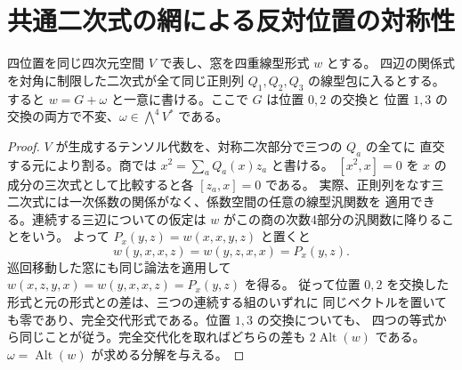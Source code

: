 \section{共通二次式の網による反対位置の対称性}
\label{sec:finite-common-net-symmetry}
\begin{lemma}\label{lem:common-net-alternating-part}
四位置を同じ四次元空間 $V$ で表し、窓を四重線型形式 $w$ とする。
四辺の関係式を対角に制限した二次式が全て同じ正則列
$Q_1,Q_2,Q_3$ の線型包に入るとする。
すると $w=G+\omega$ と一意に書ける。ここで $G$ は位置 $0,2$ の交換と
位置 $1,3$ の交換の両方で不変、$\omega\in\bigwedge^4 V^*$ である。
\end{lemma}
\begin{proof}
$V$ が生成するテンソル代数を、対称二次部分で三つの $Q_a$ の全てに
直交する元により割る。商では $x^2=\sum_a Q_a(x)z_a$ と書ける。
$[x^2,x]=0$ を $x$ の成分の三次式として比較すると各 $[z_a,x]=0$ である。
実際、正則列をなす三二次式には一次係数の関係がなく、係数空間の任意の線型汎関数を
適用できる。連続する三辺についての仮定は $w$ がこの商の次数4部分の汎関数に降りることをいう。
よって $P_x(y,z)=w(x,x,y,z)$ と置くと
\[
 w(y,x,x,z)=w(y,z,x,x)=P_x(y,z).
\]
巡回移動した窓にも同じ論法を適用して $w(x,z,y,x)=w(y,x,x,z)=P_x(y,z)$ を得る。
従って位置 $0,2$ を交換した形式と元の形式との差は、三つの連続する組のいずれに
同じベクトルを置いても零であり、完全交代形式である。位置 $1,3$ の交換についても、
四つの等式から同じことが従う。完全交代化を取ればどちらの差も
$2\operatorname{Alt}(w)$ である。$\omega=\operatorname{Alt}(w)$ が求める分解を与える。
\end{proof}


